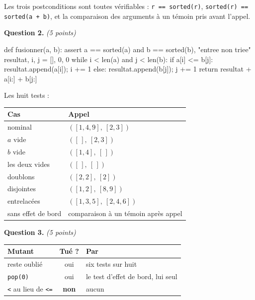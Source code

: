 Les trois postconditions sont toutes vérifiables : \lstinline{r == sorted(r)},
\lstinline{sorted(r) == sorted(a + b)}, et la comparaison des arguments à un
témoin pris avant l'appel.

\medskip
\textbf{Question 2.} \emph{(5 points)}

\begin{python}
def fusionner(a, b):
    assert a == sorted(a) and b == sorted(b), "entree non triee"
    resultat, i, j = [], 0, 0
    while i < len(a) and j < len(b):
        if a[i] <= b[j]:
            resultat.append(a[i]); i += 1
        else:
            resultat.append(b[j]); j += 1
    return resultat + a[i:] + b[j:]
\end{python}

Les huit tests :

\begin{center}
\begin{tabular}{|l|l|}
\hline
\textbf{Cas} & \textbf{Appel} \\
\hline
nominal & $([1,4,9],\ [2,3])$ \\
\hline
$a$ vide & $([\,],\ [2,3])$ \\
\hline
$b$ vide & $([1,4],\ [\,])$ \\
\hline
les deux vides & $([\,],\ [\,])$ \\
\hline
doublons & $([2,2],\ [2])$ \\
\hline
disjointes & $([1,2],\ [8,9])$ \\
\hline
entrelacées & $([1,3,5],\ [2,4,6])$ \\
\hline
sans effet de bord & comparaison à un témoin après appel \\
\hline
\end{tabular}
\end{center}

\medskip
\textbf{Question 3.} \emph{(5 points)}

\begin{center}
\begin{tabular}{|l|c|l|}
\hline
\textbf{Mutant} & \textbf{Tué ?} & \textbf{Par} \\
\hline
reste oublié & oui & six tests sur huit \\
\hline
\texttt{pop(0)} & oui & le test d'effet de bord, lui seul \\
\hline
\texttt{<} au lieu de \texttt{<=} & \textbf{non} & aucun \\
\hline
\end{tabular}
\end{center}

